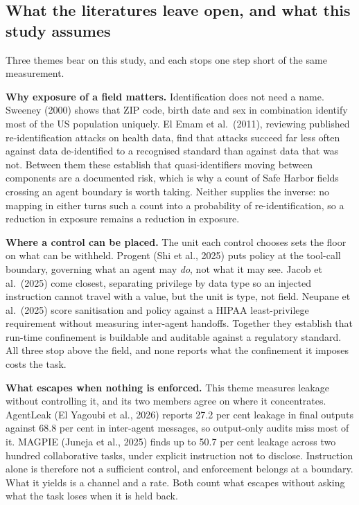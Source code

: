 \subsection{What the literatures leave open, and what this study assumes}
\label{sec:threat}

Three themes bear on this study, and each stops one step short of the same measurement.

\textbf{Why exposure of a field matters.} Identification does not need a name. Sweeney (2000) shows
that ZIP code, birth date and sex in combination identify most of the US population uniquely. El
Emam et al.\ (2011), reviewing
published re-identification attacks on health data, find that attacks succeed far less often against
data de-identified to a recognised standard than against data that was not. Between them these
establish that quasi-identifiers moving between components are a documented risk, which is why a
count of Safe Harbor fields crossing an agent boundary is worth taking. Neither supplies the
inverse: no mapping in either turns such a count into a probability of
re-identification, so a reduction in exposure remains a reduction in exposure.

\textbf{Where a control can be placed.} The unit each control chooses sets the floor on what can be
withheld. Progent (Shi et al., 2025) puts policy at the tool-call boundary, governing what an agent
may \emph{do}, not what it may see. Jacob et al.\ (2025) come closest, separating privilege by data type so an injected instruction
cannot travel with a value, but the unit is type, not field. Neupane et al.\ (2025) score
sanitisation and policy against a HIPAA least-privilege requirement without measuring inter-agent
handoffs. Together they establish that run-time confinement is buildable and auditable against a
regulatory standard. All three stop above the field, and none reports what the confinement it
imposes costs the task.

\textbf{What escapes when nothing is enforced.} This theme measures leakage without controlling it,
and its two members agree on where it concentrates. AgentLeak (El Yagoubi et al., 2026) reports 27.2 per
cent leakage in final outputs against 68.8 per cent in inter-agent messages, so output-only audits
miss most of it. MAGPIE (Juneja et al., 2025) finds up to 50.7 per cent leakage across two
hundred collaborative tasks, under explicit instruction not to disclose. Instruction alone is
therefore not a sufficient control, and enforcement belongs at a boundary. What it yields is a
channel and a rate. Both count what escapes without asking what the task loses when it is held
back.

